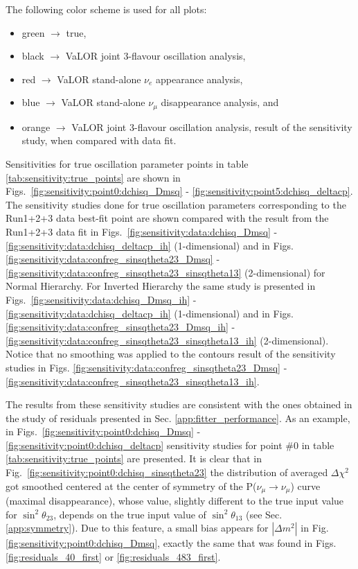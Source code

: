 The following color scheme is used for all plots:
\begin{itemize}
\item green $\rightarrow$ true,
\item black $\rightarrow$ VaLOR joint 3-flavour oscillation analysis,
\item red   $\rightarrow$ VaLOR stand-alone $\nu_{e}$ appearance analysis, 
\item blue  $\rightarrow$ VaLOR stand-alone $\nu_{\mu}$ disappearance analysis, and
\item orange  $\rightarrow$ VaLOR joint 3-flavour oscillation analysis, result of the sensitivity study, when compared with data fit. 
\end{itemize}

Sensitivities for true oscillation parameter points in table \ref{tab:sensitivity:true_points}
are shown in Figs.\ \ref{fig:sensitivity:point0:dchisq_Dmsq} - \ref{fig:sensitivity:point5:dchisq_deltacp}.
The sensitivity studies done for true oscillation parameters corresponding to the Run1+2+3 data best-fit point  
are shown compared with the result from the Run1+2+3 data fit 
in Figs.\ \ref{fig:sensitivity:data:dchisq_Dmsq} - \ref{fig:sensitivity:data:dchisq_deltacp_ih} (1-dimensional) and 
in Figs. \ref{fig:sensitivity:data:confreg_sinsqtheta23_Dmsq} - \ref{fig:sensitivity:data:confreg_sinsqtheta23_sinsqtheta13}  (2-dimensional) for Normal Hierarchy. 
For Inverted Hierarchy the same study is presented in  Figs.\ \ref{fig:sensitivity:data:dchisq_Dmsq_ih} - \ref{fig:sensitivity:data:dchisq_deltacp_ih} (1-dimensional)
and in Figs. \ref{fig:sensitivity:data:confreg_sinsqtheta23_Dmsq_ih} - \ref{fig:sensitivity:data:confreg_sinsqtheta23_sinsqtheta13_ih}  (2-dimensional). 
Notice that no smoothing was applied to the contours result of the sensitivity studies 
in Figs. \ref{fig:sensitivity:data:confreg_sinsqtheta23_Dmsq} - \ref{fig:sensitivity:data:confreg_sinsqtheta23_sinsqtheta13_ih}.


The results from these sensitivity studies are consistent with the ones obtained in the study of residuals 
presented in Sec. \ref{app:fitter_performance}.
As an example, in Figs.\ \ref{fig:sensitivity:point0:dchisq_Dmsq} - \ref{fig:sensitivity:point0:dchisq_deltacp} 
sensitivity studies for point \#0 in table  \ref{tab:sensitivity:true_points} are presented. 
It is clear that in Fig.\ \ref{fig:sensitivity:point0:dchisq_sinsqtheta23} the distribution of averaged $\Delta\chi^{2}$ 
got smoothed centered at the center of symmetry of the P($\nu_{\mu}\rightarrow\nu_{\mu}$) curve (maximal disappearance),
whose value, slightly different to the true input value for $\sin^{2}\theta_{23}$, depends on the true input value of $\sin^{2}\theta_{13}$ (see Sec. \ref{app:symmetry}). 
Due to this feature, a small bias appears for $|\Delta m^{2}|$ in Fig. \ref{fig:sensitivity:point0:dchisq_Dmsq},
exactly the same that was found in Figs. \ref{fig:residuals_40_first} or \ref{fig:residuals_483_first}.

